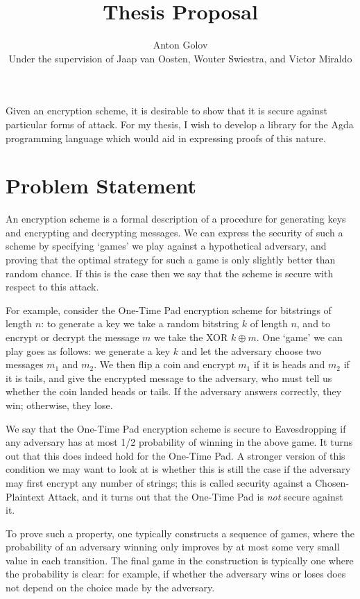 \documentclass{article}
\title{Thesis Proposal}
\author{Anton Golov\\Under the supervision of Jaap van Oosten, Wouter Swiestra, and Victor Miraldo}
\begin{document}
    \maketitle

    Given an encryption scheme, it is desirable to show that it is secure against particular forms of attack.  For my
    thesis, I wish to develop a library for the Agda programming language which would aid in expressing proofs of this
    nature.

    \section{Problem Statement}

    An encryption scheme is a formal description of a procedure for generating keys and encrypting and decrypting
    messages.  We can express the security of such a scheme by specifying `games' we play against a hypothetical
    adversary, and proving that the optimal strategy for such a game is only slightly better than random chance.  If
    this is the case then we say that the scheme is secure with respect to this attack.

    For example, consider the One-Time Pad encryption scheme for bitstrings of length $n$: to generate a key we take a
    random bitstring $k$ of length $n$, and to encrypt or decrypt the message $m$ we take the XOR $k \oplus m$.  One
    `game' we can play goes as follows: we generate a key $k$ and let the adversary choose two messages $m_1$ and $m_2$.
    We then flip a coin and encrypt $m_1$ if it is heads and $m_2$ if it is tails, and give the encrypted message to the
    adversary, who must tell us whether the coin landed heads or tails.  If the adversary answers correctly, they win;
    otherwise, they lose.

    We say that the One-Time Pad encryption scheme is secure to Eavesdropping if any adversary has at most 1/2
    probability of winning in the above game.  It turns out that this does indeed hold for the One-Time Pad.  A stronger
    version of this condition we may want to look at is whether this is still the case if the adversary may first
    encrypt any number of strings; this is called security against a Chosen-Plaintext Attack, and it turns out that the
    One-Time Pad is \emph{not} secure against it.

    To prove such a property, one typically constructs a sequence of games, where the probability of an adversary
    winning only improves by at most some very small value in each transition.  The final game in the construction is
    typically one where the probability is clear: for example, if whether the adversary wins or loses does not depend on
    the choice made by the adversary.
\end{document}
